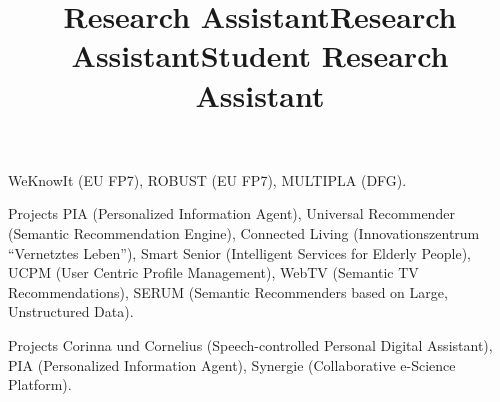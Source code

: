 \documentclass[line,margin]{res}
\begin{document}
\begin{resume}
\title{\bf Research Assistant}
\begin{position}
  WeKnowIt (EU FP7), ROBUST (EU FP7), MULTIPLA (DFG).
\end{position}

\title{\bf Research Assistant}
\begin{position}
Projects PIA (Personalized Information Agent), Universal Recommender
(Semantic Recommendation Engine), Connected Living (Innovationszentrum
``Vernetztes Leben''), Smart Senior (Intelligent Services for Elderly People),
UCPM (User Centric Profile Management), WebTV (Semantic TV
Recommendations), SERUM (Semantic Recommenders based on Large,
Unstructured Data).    
\end{position}

\title{\bf Student Research Assistant}
\begin{position}
Projects Corinna und Cornelius (Speech-controlled Personal Digital
Assistant), PIA (Personalized Information Agent), Synergie
(Collaborative e-Science Platform).  
\end{position}


\end{resume}
\end{document}
